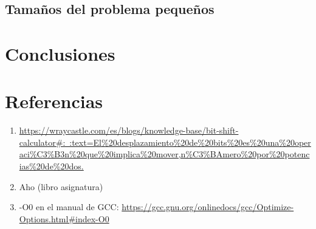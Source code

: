 \documentclass[11pt,a4paper,twoside]{article}
\theoremstyle{definition}
\begin{document}
	\subsection{Tamaños del problema pequeños}
	
	
	\section{Conclusiones}
	
	
	\section*{Referencias}
	
	\begin{enumerate}
		\item \href{https://wraycastle.com/es/blogs/knowledge-base/bit-shift-calculator#:~:text=El%20desplazamiento%20de%20bits%20es%20una%20operaci%C3%B3n%20que%20implica%20mover,n%C3%BAmero%20por%20potencias%20de%20dos.}{https://wraycastle.com/es/blogs/knowledge-base/bit-shift-calculator\#:~:text=El\%20desplazamiento\%20de\%20bits\%20es\%20una\%20operaci\%C3\%B3n\%20que\%20implica\%20mover,n\%C3\%BAmero\%20por\%20potencias\%20de\%20dos.}
		
		\item Aho (libro asignatura)
		
		\item -O0 en el manual de GCC: \href{https://gcc.gnu.org/onlinedocs/gcc/Optimize-Options.html#index-O0}{https://gcc.gnu.org/onlinedocs/gcc/Optimize-Options.html\#index-O0}
	\end{enumerate}
	
	
	
\end{document}
